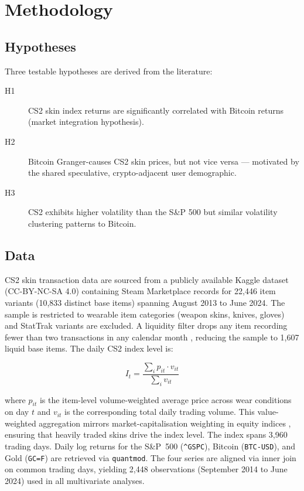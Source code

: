 \section{Methodology}
\label{sec:methodology}

\subsection{Hypotheses}

Three testable hypotheses are derived from the literature:

\begin{description}
  \item[H1] CS2 skin index returns are significantly correlated with Bitcoin
    returns (market integration hypothesis).

  \item[H2] Bitcoin Granger-causes CS2 skin prices, but not vice versa ---
    motivated by the shared speculative, crypto-adjacent user demographic.

  \item[H3] CS2 exhibits higher volatility than the S\&P 500 but similar
    volatility clustering patterns to Bitcoin.
\end{description}

\subsection{Data}

CS2 skin transaction data are sourced from a publicly available Kaggle dataset
(CC-BY-NC-SA 4.0) containing Steam Marketplace records for 22,446 item
variants (10,833 distinct base items) spanning August 2013 to June 2024. The
sample is restricted to wearable item categories (weapon skins, knives, gloves)
and StatTrak variants are excluded. A liquidity filter drops any item recording
fewer than two transactions in any calendar month
\cite{six2024indexcriteria}, reducing the sample to 1,607 liquid base items.
The daily CS2 index level is:

\begin{equation}
  I_t = \frac{\sum_{i} p_{it} \cdot v_{it}}{\sum_{i} v_{it}}
  \label{eq:index}
\end{equation}

where $p_{it}$ is the item-level volume-weighted average price across wear
conditions on day $t$ and $v_{it}$ is the corresponding total daily trading
volume. This value-weighted aggregation mirrors market-capitalisation weighting
in equity indices \cite{msci2024indexconstruction}, ensuring that heavily traded
skins drive the index level. The index spans 3,960 trading days. Daily log
returns for the S\&P~500 (\texttt{\^{}GSPC}), Bitcoin (\texttt{BTC-USD}), and
Gold (\texttt{GC=F}) are retrieved via \texttt{quantmod}. The four series are
aligned via inner join on common trading days, yielding 2,448 observations
(September 2014 to June 2024) used in all multivariate analyses.

